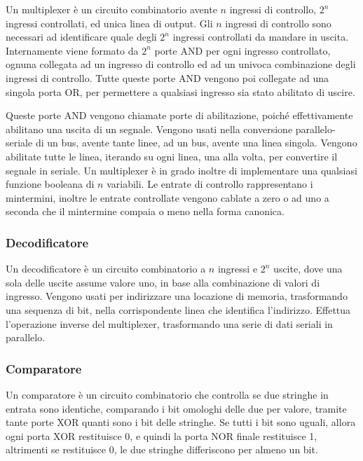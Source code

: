 \documentclass{article}
\numberwithin{equation}{subsection}
\begin{document}
Un multiplexer è un circuito combinatorio avente $n$ ingressi di controllo, $2^n$ ingressi controllati, ed unica linea di output. Gli $n$ ingressi di controllo sono necessari ad identificare quale degli $2^n$ 
ingressi controllati da mandare in uscita. Internamente viene formato da $2^n$ porte AND per ogni ingresso controllato, ognuna collegata ad un ingresso di controllo ed ad un univoca combinazione degli 
ingressi di controllo. Tutte queste porte AND vengono poi collegate ad una singola porta OR, per permettere a qualsiasi ingresso sia stato abilitato di uscire. 


Queste porte AND vengono chiamate porte di abilitazione, poiché effettivamente abilitano una uscita di un segnale. Vengono usati nella conversione parallelo-seriale di un bus, avente tante linee, ad un bus, avente 
una linea singola. Vengono abilitate tutte le linea, iterando su ogni linea, una alla volta, per convertire il segnale in seriale. Un multiplexer è in grado inoltre di implementare una qualsiasi funzione 
booleana di $n$ variabili. Le entrate di controllo rappresentano i mintermini, inoltre le entrate controllate vengono cablate a zero o ad uno a seconda che il mintermine compaia o meno nella forma canonica. 

\subsubsection{Decodificatore}

Un decodificatore è un circuito combinatorio a $n$ ingressi e $2^n$ uscite, dove una sola delle uscite assume valore uno, in base alla combinazione di valori di ingresso. Vengono usati per indirizzare una 
locazione di memoria, trasformando una sequenza di bit, nella corrispondente linea che identifica l'indirizzo. Effettua l'operazione inverse del multiplexer, trasformando una serie di dati seriali in parallelo. 


\subsubsection{Comparatore}

Un comparatore è un circuito combinatorio che controlla se due stringhe in entrata sono identiche, comparando i bit omologhi delle due per valore, tramite tante porte XOR quanti sono i bit delle stringhe. Se tutti 
i bit sono uguali, allora ogni porta XOR restituisce 0, e quindi la porta NOR finale restituisce 1, altrimenti se restituisce 0, le due stringhe differiscono per almeno un bit. 
\end{document}
